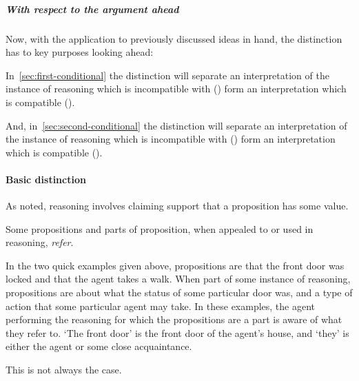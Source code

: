 \subparagraph*{With respect to the argument ahead}

\begin{note}
  Now, with the application to previously discussed ideas in hand, the distinction has to key purposes looking ahead:

  In~\autoref{sec:first-conditional} the distinction will separate an interpretation of the instance of reasoning which is incompatible with \ESU{} (\ur{}) form an interpretation which is compatible (\nr{}).

  And, in~\autoref{sec:second-conditional} the distinction will separate an interpretation of the instance of reasoning which is incompatible with \nI{} (\nr{}) form an interpretation which is compatible (\ur{}).
\end{note}

\paragraph*{Basic distinction}

\begin{note}[Reasoning]
  As noted, reasoning involves claiming support that a proposition has some value.

  Some propositions and parts of proposition, when appealed to or used in reasoning, \emph{refer}.

  In the two quick examples given above, propositions are that the front door was locked and that the agent takes a walk.
  When part of some instance of reasoning, propositions are about what the status of some particular door was, and a type of action that some particular agent may take.
  In these examples, the agent performing the reasoning for which the propositions are a part is aware of what they refer to.
  `The front door' is the front door of the agent's house, and `they' is either the agent or some close acquaintance.

  This is not always the case.

\end{note}

